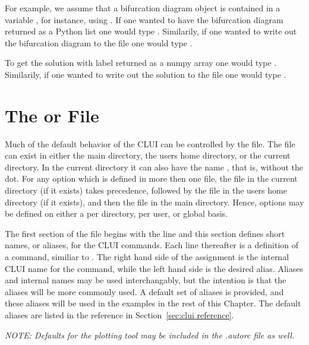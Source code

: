 \documentclass[12pt]{report}
\begin{document}
 For example, we assume
 that a bifurcation diagram object is contained in a variable
 , for instance, using .  If
 one wanted to have the bifurcation diagram returned as a Python list
 one would type .  Similarily, if one wanted
 to write out the bifurcation diagram to the file 
 one would type .

 To get the solution with label  returned as a numpy
 array one would type .
 Similarily, if one wanted to write out the solution
 to the file  one would type
 .

 \section{ The  or  File }

 Much of the default behavior of the \AUTO CLUI
 can be controlled by the  file.
 The  file can exist in
 either the main \AUTO directory, the users
 home directory, or the current directory. In the current directory
 it can also have the name , that is, without the dot.
 For any
 option which is defined in more then one file, 
 the  file
 in the current directory (if it exists) takes precedence, 
 followed by the  file
 in the users home directory (if it exists), and then the
  file in the main \AUTO directory.  Hence, 
 options may be defined on either a per directory, per
 user, or global basis.  

 The first section of the  file
 begins with the line 
 and this section defines short names, or aliases,
 for the \AUTO CLUI commands.  
 Each line thereafter is a definition of
 a command, similiar to 
 .
 The right hand side of the assignment
 is the internal \AUTO CLUI name for the command,
 while the left hand side is the desired alias.  
 Aliases and
 internal names may be used interchangably, but the
 intention is that the aliases will be more commonly
 used.  A default set of aliases is provided, and
 these aliases will be used in the examples in the
 rest of this Chapter.  The default aliases
 are listed in the reference in Section~\ref{sec:clui reference}.

 {\em NOTE:  Defaults for the plotting tool may be included in
 the .autorc file as well.}
\end{document}
